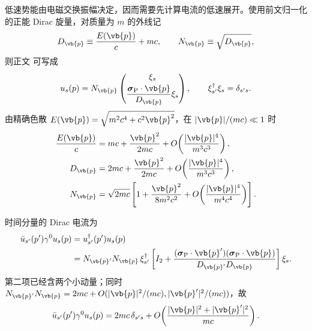 \begin{derivation}
低速势能由电磁交换振幅决定，因而需要先计算电流的低速展开。使用前文归一化的正能 Dirac 旋量，对质量为 $m$ 的外线记
\begin{equation*}
 D_{\vb{p}}\equiv \frac{E(\vb{p})}{c}+mc,
 \qquad
 N_{\vb{p}}\equiv\sqrt{D_{\vb{p}}},
\end{equation*}
则正文 可写成
\begin{equation*}
 u_s(p)=N_{\vb{p}}
 \begin{pmatrix}
 \xi_s\\[1mm]
 \dfrac{\boldsymbol\sigma_{\rm P}\cdot\vb{p}}{D_{\vb{p}}}\xi_s
 \end{pmatrix},
 \qquad
 \xi_{s'}^\dagger\xi_s=\delta_{s's}.
\end{equation*}
由精确色散
$E(\vb{p})=\sqrt{m^2c^4+c^2\vb{p}^2}$，在
$|\vb{p}|/(mc)\ll1$ 时
\begin{align*}
 \frac{E(\vb{p})}{c}
 &=mc+\frac{\vb{p}^2}{2mc}
 +O\!\left(\frac{|\vb{p}|^4}{m^3c^3}\right),\\
 D_{\vb{p}}
 &=2mc+\frac{\vb{p}^2}{2mc}
 +O\!\left(\frac{|\vb{p}|^4}{m^3c^3}\right),\\
 N_{\vb{p}}
 &=\sqrt{2mc}\left[
 1+\frac{\vb{p}^2}{8m^2c^2}
 +O\!\left(\frac{|\vb{p}|^4}{m^4c^4}\right)
 \right].
\end{align*}

时间分量的 Dirac 电流为
\begin{align*}
 \bar u_{s'}(p')\gamma^0u_s(p)
 &=u_{s'}^\dagger(p')u_s(p)\\
 &=N_{\vb{p}'}N_{\vb{p}}\,
 \xi_{s'}^\dagger\left[
 I_2+
 \frac{(\boldsymbol\sigma_{\rm P}\cdot\vb{p}')
       (\boldsymbol\sigma_{\rm P}\cdot\vb{p})}
 {D_{\vb{p}'}D_{\vb{p}}}
 \right]\xi_s.
\end{align*}
第二项已经含两个小动量；同时
$N_{\vb{p}'}N_{\vb{p}}=2mc+O(|\vb{p}|^2/(mc),|\vb{p}'|^2/(mc))$，故
\begin{equation*}
 {
 \bar u_{s'}(p')\gamma^0u_s(p)
 =2mc\,\delta_{s's}
 +O\!\left(\frac{|\vb{p}|^2+|\vb{p}'|^2}{mc}\right).}
\end{equation*}


\end{derivation}

